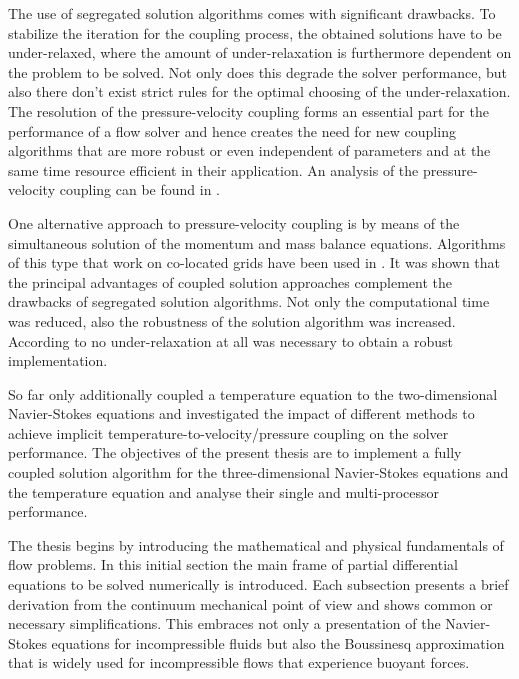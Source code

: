 The use of segregated solution algorithms comes with significant drawbacks. To stabilize the iteration for the coupling process, the obtained solutions have to be under-relaxed, where the amount of under-relaxation is furthermore dependent on the problem to be solved. Not only does this degrade the solver performance, but also there don't exist strict rules for the optimal choosing of the under-relaxation. The resolution of the pressure-velocity coupling forms an essential part for the performance of a flow solver and hence creates the need for new coupling algorithms that are more robust or even independent of parameters and at the same time resource efficient in their application. An analysis of the pressure-velocity coupling can be found in \cite{peric90}.

One alternative approach to pressure-velocity coupling is by means of the simultaneous solution of the momentum and mass balance equations. Algorithms of this type that work on co-located grids have been used in \cite{chen10,darwish09,falk13,galpin86,klaij13,mangani14,vakilipour12}. It was shown that the principal advantages of coupled solution approaches complement the drawbacks of segregated solution algorithms. Not only the computational time was reduced, also the robustness of the solution algorithm was increased. According to \cite{darwish09} no under-relaxation at all was necessary to obtain a robust implementation. 

So far only \cite{galpin86,vakilipour12} additionally coupled a temperature equation to the two-dimensional Navier-Stokes equations and investigated the impact of different methods to achieve implicit temperature-to-velocity/pressure coupling on the solver performance. The objectives of the present thesis are to implement a fully coupled solution algorithm for the three-dimensional Navier-Stokes equations and the temperature equation and analyse their single and multi-processor performance.

The thesis begins by introducing the mathematical and physical fundamentals of flow problems. In this initial section the main frame of partial differential equations to be solved numerically is introduced. Each subsection presents a brief derivation from the continuum mechanical point of view and shows common or necessary simplifications. This embraces not only a presentation of the Navier-Stokes equations for incompressible fluids but also the Boussinesq approximation that is widely used for incompressible flows that experience buoyant forces.

